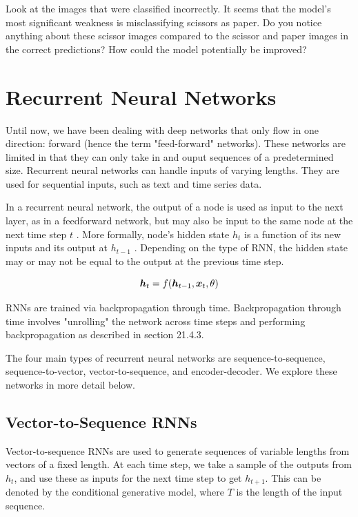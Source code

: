 \documentclass{article}
\begin{document}
\FloatBarrier

Look at the images that were classified incorrectly. It seems that the model's most significant weakness is misclassifying scissors as paper. Do you notice anything about these scissor images compared to the scissor and paper images in the correct predictions? How could the model potentially be improved?

\section{Recurrent Neural Networks}

Until now, we have been dealing with deep networks that only flow in one direction: forward (hence the term "feed-forward" networks). These networks are limited in that they can only take in and ouput sequences of a predetermined size. Recurrent neural networks can handle inputs of varying lengths. They are used for sequential inputs, such as text and time series data.

In a recurrent neural network, the output of a node is used as input to the next layer, as in a feedforward network, but may also be input to the same node at the next time step \(t\) \cite{hands-on-ml}. More formally, node's hidden state \(h_t\) is a function of its new inputs and its output at \(h_{t-1}\) \cite{Goodfellow-et-al-2016}. Depending on the type of RNN, the hidden state may or may not be equal to the output at the previous time step.

\[\vb*{h}_t = f(\vb*{h}_{t-1},\vb*{x}_t,\theta)\]

RNNs are trained via backpropagation through time. Backpropagation through time involves "unrolling" the network across time steps and performing backpropagation as described in section 21.4.3. 

The four main types of recurrent neural networks are sequence-to-sequence, sequence-to-vector, vector-to-sequence, and encoder-decoder. We explore these networks in more detail below.

\subsection{Vector-to-Sequence RNNs}

Vector-to-sequence RNNs are used to generate sequences of variable lengths from vectors of a fixed length. At each time step, we take a sample of the outputs from \(h_t\), and use these as inputs for the next time step to get \(h_{t+1}\). This can be denoted by the conditional generative model, where \(T\) is the length of the input sequence.
\end{document}
